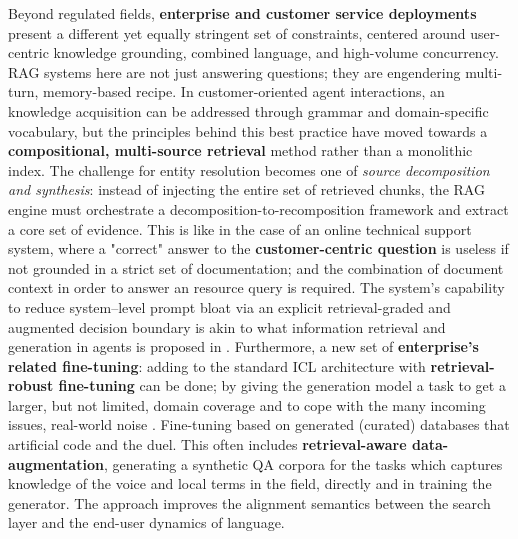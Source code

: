 \documentclass[11pt,a4paper]{article}
\begin{document}
Beyond regulated fields, \textbf{enterprise and customer service deployments} present a different yet equally stringent set of constraints, centered around user-centric knowledge grounding, combined language, and high-volume concurrency. RAG systems here are not just answering questions; they are engendering multi-turn, memory-based recipe. In customer-oriented agent interactions, an knowledge acquisition can be addressed through grammar and domain-specific vocabulary, but the principles behind this best practice have moved towards a \textbf{compositional, multi-source retrieval} method rather than a monolithic index. The challenge for entity resolution becomes one of \emph{source decomposition and synthesis}: instead of injecting the entire set of retrieved chunks, the RAG engine must orchestrate a decomposition-to-recomposition framework and extract a core set of evidence. This is like in the case of an online technical support system, where a "correct" answer to the \textbf{customer-centric question} is useless if not grounded in a strict set of documentation; and the combination of document context in order to answer an resource query is required. The system's capability to reduce system--level prompt bloat via an explicit retrieval-graded and augmented decision boundary is akin to what information retrieval and generation in agents is proposed in \cite{arxiv:2505.03275v1}. Furthermore, a new set of \textbf{enterprise's related fine-tuning}: adding to the standard ICL architecture with \textbf{retrieval-robust fine-tuning} can be done; by giving the generation model a task to get a larger, but not limited, domain coverage and to cope with the many incoming issues, real-world noise \cite{arxiv:2501.18365v1}. Fine-tuning based on generated (curated) databases that artificial code and the duel. This often includes \textbf{retrieval-aware data-augmentation}, generating a synthetic QA corpora for the tasks which captures knowledge of the voice and local terms in the field, directly and in training the generator. The approach improves the alignment semantics between the search layer and the end-user dynamics of language.
\end{document}
